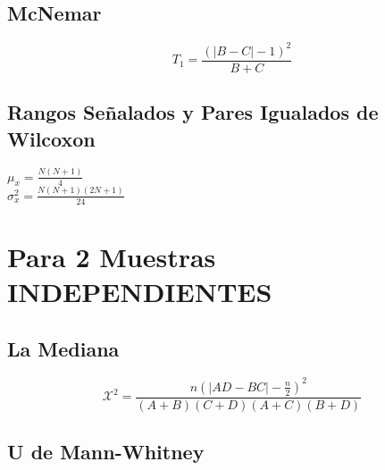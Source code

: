 \documentclass[12pt]{article}
\newcommand{\X}{\mathscr{X}}
\begin{document}
\subsection*{McNemar}
\begin{center}
\begin{tcolorbox}[colback=white,colframe=black,width=8 cm]
\large{
$$T_{1} = \frac{(\left | B-C \right | - 1)^2}{B+C} $$
}
\end{tcolorbox}
\end{center}




\subsection*{Rangos Señalados y Pares Igualados de Wilcoxon}

\begin{center}
\begin{tcolorbox}[colback=white,colframe=black,width=14cm ,coltitle=white]
\begin{multicols}{2} 
\large{
\begin{center}
\large{
$\mu_{x} = \frac{N(N+1)}{4}$\\
$\sigma^2_{x}= \frac{N(N+1)(2N+1)}{24}$
}
\end{center}}
\end{multicols} 
\end{tcolorbox}
\end{center}





\section*{Para 2 Muestras INDEPENDIENTES}
\subsection*{La Mediana}
\begin{center}
\begin{tcolorbox}[colback=white,colframe=black,width=12 cm]
\large{
$$\X^2 = \frac{n(\left | AD-BC \right | - \frac{n}{2})^2}{(A+B)(C+D)(A+C)(B+D)} $$
}
\end{tcolorbox}
\end{center}




\subsection*{U de Mann-Whitney}
\end{document}
